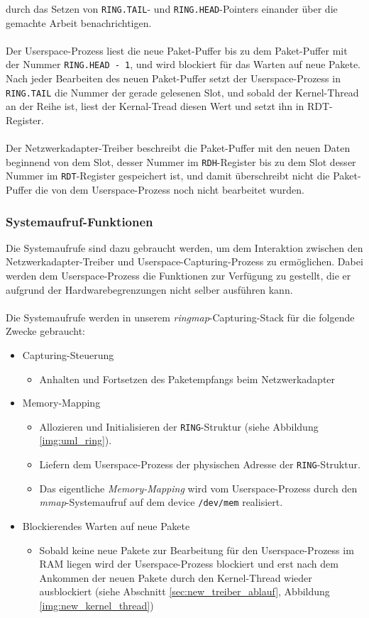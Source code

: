 durch das Setzen von \verb+RING.TAIL+- und \verb+RING.HEAD+-Pointers einander über
die gemachte Arbeit benachrichtigen. \\\\
%
Der Userspace-Prozess liest die neue
Paket-Puffer bis zu dem Paket-Puffer mit der Nummer \verb+RING.HEAD - 1+, und
wird blockiert für das Warten auf neue Pakete. Nach jeder Bearbeiten des neuen
Paket-Puffer setzt der Userspace-Prozess in \verb+RING.TAIL+ die Nummer der
gerade gelesenen Slot, und sobald der Kernel-Thread an der Reihe ist, liest der
Kernal-Tread diesen Wert und setzt ihn in  RDT-Register.\\\\
%
Der Netzwerkadapter-Treiber beschreibt die Paket-Puffer mit den neuen Daten beginnend
von dem Slot, desser Nummer im \verb+RDH+-Register bis zu dem Slot desser
Nummer im \verb+RDT+-Register gespeichert ist, und damit überschreibt nicht die
Paket-Puffer die von dem Userspace-Prozess noch nicht bearbeitet wurden.

\subsubsection{Systemaufruf-Funktionen}\label{sec:entw_syscalls}
Die Systemaufrufe sind dazu gebraucht werden, um dem Interaktion zwischen den
Netzwerkadapter-Treiber und Userspace-Capturing-Prozess zu ermöglichen. Dabei werden
dem Userspace-Prozess die Funktionen zur Verfügung zu gestellt, die er aufgrund
der Hardwarebegrenzungen nicht selber ausführen kann.\\\\ 
%
Die Systemaufrufe werden in unserem \emph{ringmap}-Capturing-Stack für die folgende
Zwecke gebraucht: 
\begin{itemize}
	\item Capturing-Steuerung
		\begin{itemize}
			\item Anhalten und Fortsetzen des Paketempfangs beim Netzwerkadapter
		\end{itemize}
	\item Memory-Mapping
		\begin{itemize}
			\item Allozieren und Initialisieren der \verb+RING+-Struktur (siehe
				Abbildung \ref{img:uml_ring}).
			\item Liefern dem Userspace-Prozess der physischen Adresse der
				\verb+RING+-Struktur.
			\item Das eigentliche \emph{Memory-Mapping} wird vom
				Userspace-Prozess durch den \emph{mmap}-Systemaufruf auf dem
				device \verb+/dev/mem+ realisiert.
		\end{itemize}
	\item Blockierendes Warten auf neue Pakete
		\begin{itemize}
			\item Sobald keine neue Pakete zur Bearbeitung für den
				Userspace-Prozess im RAM liegen wird der Userspace-Prozess
				blockiert und erst nach dem Ankommen der neuen Pakete
				durch den Kernel-Thread wieder ausblockiert (siehe Abschnitt
				\ref{sec:new_treiber_ablauf}, Abbildung
				\ref{img:new_kernel_thread})
		\end{itemize}
\end{itemize}
